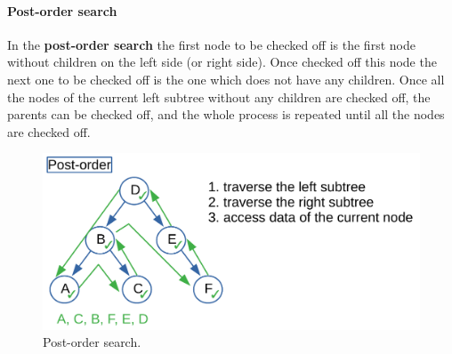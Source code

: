 \paragraph{Post-order search}
\label{postorder}
In the \textbf{post-order search} the first node to be checked off is the first node without children on the left side (or right side). Once checked off this node the next one to be checked off is the one which does not have any children. Once all the nodes of the current left subtree without any children are checked off, the parents can be checked off, and the whole process is repeated until all the nodes are checked off.

\begin{figure}[H]
	\begin{center}
		\includegraphics[scale=.6]{chapters/trees/images/trees_7.pdf}
		\caption[Post-order search.]{Post-order search.}
		\label{trees_7}
	\end{center}
\end{figure}

